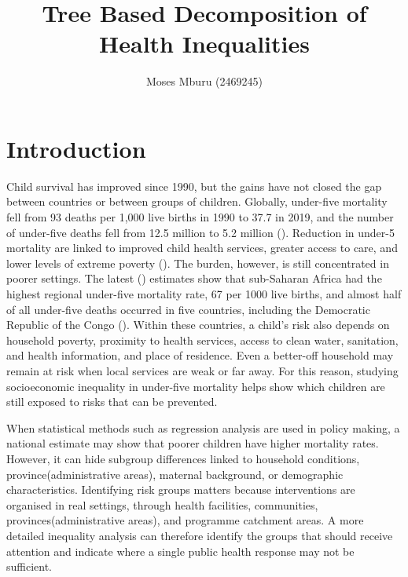 \documentclass[
  11pt,
  a4paper,
]{article}
\title{Tree Based Decomposition of Health Inequalities}
\author{Moses Mburu (2469245)}
\date{}
\begin{document}
\maketitle


\section{Introduction}\label{sec-introduction}

Child survival has improved since 1990, but the gains have not closed
the gap between countries or between groups of children. Globally,
under-five mortality fell from 93 deaths per 1,000 live births in 1990
to 37.7 in 2019, and the number of under-five deaths fell from 12.5
million to 5.2 million
(). Reduction in under-5 mortality are linked to improved child
health services, greater access to care, and lower levels of extreme
poverty (). The burden, however, is still concentrated in poorer settings.
The latest () estimates show that sub-Saharan Africa had
the highest regional under-five mortality rate, 67 per 1000 live births,
and almost half of all under-five deaths occurred in five countries,
including the Democratic Republic of the Congo
(). Within these countries, a child's risk also depends on household
poverty, proximity to health services, access to clean water,
sanitation, and health information, and place of residence. Even a
better-off household may remain at risk when local services are weak or
far away. For this reason, studying socioeconomic inequality in
under-five mortality helps show which children are still exposed to
risks that can be prevented.

When statistical methods such as regression analysis are used in policy
making, a national estimate may show that poorer children have higher
mortality rates. However, it can hide subgroup differences linked to
household conditions, province(administrative areas), maternal
background, or demographic characteristics. Identifying risk groups
matters because interventions are organised in real settings, through
health facilities, communities, provinces(administrative areas), and
programme catchment areas. A more detailed inequality analysis can
therefore identify the groups that should receive attention and indicate
where a single public health response may not be sufficient.
\end{document}
